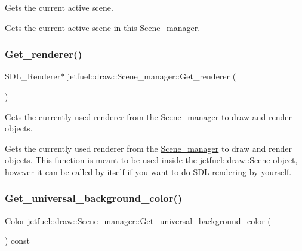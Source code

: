 Gets the current active scene. 

Gets the current active scene in this \hyperlink{classjetfuel_1_1draw_1_1Scene__manager}{Scene\+\_\+manager}. \mbox{\label{classjetfuel_1_1draw_1_1Scene__manager_af8356086304df2aff630e09f07d57ca7}} 
\subsubsection{\texorpdfstring{Get\+\_\+renderer()}{Get\_renderer()}}
{\footnotesize\ttfamily S\+D\+L\+\_\+\+Renderer$\ast$ jetfuel\+::draw\+::\+Scene\+\_\+manager\+::\+Get\+\_\+renderer (\begin{DoxyParamCaption}{ }\end{DoxyParamCaption})\hspace{0.3cm}{\ttfamily [inline]}}



Gets the currently used renderer from the \hyperlink{classjetfuel_1_1draw_1_1Scene__manager}{Scene\+\_\+manager} to draw and render objects. 

Gets the currently used renderer from the \hyperlink{classjetfuel_1_1draw_1_1Scene__manager}{Scene\+\_\+manager} to draw and render objects. This function is meant to be used inside the \hyperlink{classjetfuel_1_1draw_1_1Scene}{jetfuel\+::draw\+::\+Scene} object, however it can be called by itself if you want to do S\+DL rendering by yourself. \mbox{\label{classjetfuel_1_1draw_1_1Scene__manager_a1f8e3144806b276df030ab9db20fa185}} 
\subsubsection{\texorpdfstring{Get\+\_\+universal\+\_\+background\+\_\+color()}{Get\_universal\_background\_color()}}
{\footnotesize\ttfamily \hyperlink{classjetfuel_1_1draw_1_1Color}{Color} jetfuel\+::draw\+::\+Scene\+\_\+manager\+::\+Get\+\_\+universal\+\_\+background\+\_\+color (\begin{DoxyParamCaption}{ }\end{DoxyParamCaption}) const\hspace{0.3cm}{\ttfamily [inline]}}



